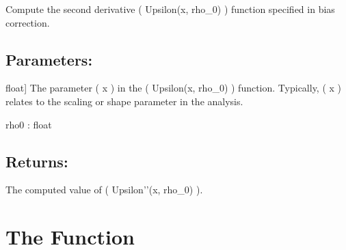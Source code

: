 \documentclass[a4paper,11pt,openany,english]{sphinxmanual}
\begin{document}
\begin{fulllineitems}
\label{\detokenize{api_biascorrection:xtremes.biascorrection.Upsilon_2ndderivative}}
\pysigstartsignatures
{}
\pysigstopsignatures
\sphinxAtStartPar
Compute the second derivative ( Upsilon(x, rho\_0) ) function specified in bias correction.


\subsection{Parameters:}
\label{\detokenize{api_biascorrection:id17}}\begin{description}
\sphinxlineitem{x}{[}float{]}
\sphinxAtStartPar
The parameter ( x ) in the ( Upsilon(x,  rho\_0) ) function. Typically, ( x ) relates 
to the scaling or shape parameter in the analysis.

\end{description}

\sphinxAtStartPar
rho0 : float


\subsection{Returns:}
\label{\detokenize{api_biascorrection:id18}}\begin{description}
\sphinxAtStartPar
The computed value of ( Upsilon’’(x, rho\_0) ).

\end{description}

\end{fulllineitems}



\section{The  Function}
\label{\detokenize{api_biascorrection:the-psi-function}}
\end{document}
